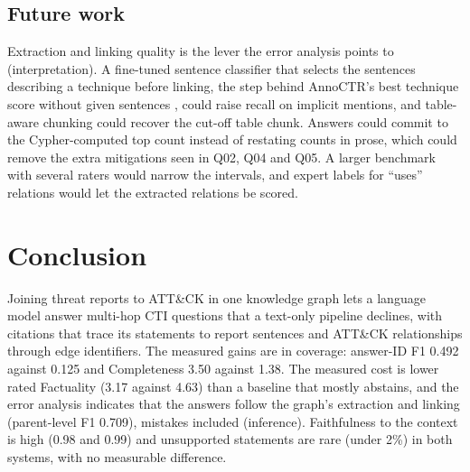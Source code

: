 \documentclass[conference,letterpaper]{IEEEtran}
\begin{document}
\subsection{Future work}
Extraction and linking quality is the lever the error analysis points to (interpretation). A fine-tuned sentence classifier that selects the sentences describing a technique before linking, the step behind AnnoCTR's best technique score without given sentences \cite{lange2024}, could raise recall on implicit mentions, and table-aware chunking could recover the cut-off table chunk. Answers could commit to the Cypher-computed top count instead of restating counts in prose, which could remove the extra mitigations seen in Q02, Q04 and Q05. A larger benchmark with several raters would narrow the intervals, and expert labels for ``uses'' relations would let the extracted relations be scored.

\section{Conclusion}
Joining threat reports to ATT\&CK in one knowledge graph lets a language model answer multi-hop CTI questions that a text-only pipeline declines, with citations that trace its statements to report sentences and ATT\&CK relationships through edge identifiers. The measured gains are in coverage: answer-ID F1 0.492 against 0.125 and Completeness 3.50 against 1.38. The measured cost is lower rated Factuality (3.17 against 4.63) than a baseline that mostly abstains, and the error analysis indicates that the answers follow the graph's extraction and linking (parent-level F1 0.709), mistakes included (inference). Faithfulness to the context is high (0.98 and 0.99) and unsupported statements are rare (under 2\%) in both systems, with no measurable difference.
\end{document}
